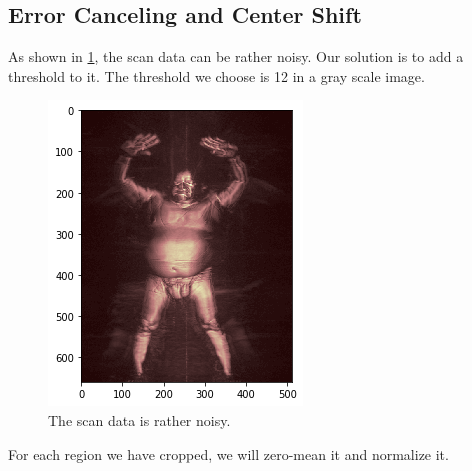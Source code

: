 \documentclass[conference,compsoc]{IEEEtran}
\begin{document}
	\subsection{Error Canceling and Center Shift}
		\par As shown in \ref{noisy}, the scan data can be rather noisy. Our solution is to add a threshold to it. The threshold we choose is 12 in a gray scale image.
		\begin{figure}[h] \label{noisy}
			\centering
			\includegraphics[width=0.7\linewidth]{./Pic/noisy}
			\caption{The scan data is rather noisy.}
		\end{figure}
		\par For each region we have cropped, we will zero-mean it and normalize it.
\end{document}
